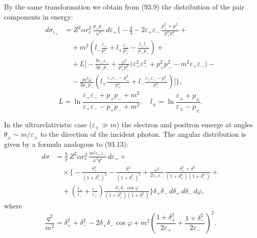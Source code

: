 By the same transformation we obtain from (93.9) the distribution of the pair components in energy:
\begin{equation}
\begin{split}
d\sigma_{\varepsilon_+} &= Z^2\alpha r_\mathrm{e}^2\,\frac{p_+p_-}{\omega^3}\,d\varepsilon_+\biggl\{-\frac{4}{3} - 2\varepsilon_+\varepsilon_-\,\frac{p_+^2 + p_-^2}{p_+^2 p_-^2} + {} \\
&\quad {} + m^2\!\left(l_-\frac{\varepsilon_+}{p_-^2} + l_+\frac{\varepsilon_-}{p_+^2} - \frac{l_+l_-}{p_+p_-}\right) + {} \\
&\quad {} + L\biggl[-\frac{8\varepsilon_+\varepsilon_-}{3p_+p_-} + \frac{\omega^3}{p_+^3 p_-^3}\bigl(\varepsilon_+^2\varepsilon_-^2 + p_+^2 p_-^2 - m^2\varepsilon_+\varepsilon_-\bigr) - {} \\
&\quad {} - \frac{m^2\omega}{2p_+p_-}\!\left(l_+\frac{\varepsilon_+\varepsilon_- - p_+^2}{p_+^3} + l_-\frac{\varepsilon_+\varepsilon_- - p_-^2}{p_-^3}\right)\biggr]\biggr\},
\end{split}
\label{eq:94.2}
\end{equation}
\[
L = \ln\frac{\varepsilon_+\varepsilon_- + p_+p_- + m^2}{\varepsilon_+\varepsilon_- - p_+p_- + m^2}, \quad l_\pm = \ln\frac{\varepsilon_\pm + p_\pm}{\varepsilon_\pm - p_\pm}.
\]


In the ultrarelativistic case ($\varepsilon_\pm \gg m$) the electron and positron emerge at angles $\theta_\pm \sim m/\varepsilon_\pm$ to the direction of the incident photon. The angular distribution is given by a formula analogous to (93.13):
\begin{equation}
\begin{split}
d\sigma &= \frac{8}{\pi}\,Z^2\alpha r_\mathrm{e}^2\,\frac{m^2\varepsilon_+\varepsilon_-}{\omega^3 q^4}\,d\varepsilon_+ \times {} \\
&\quad \times \biggl\{-\frac{\delta_+^2}{(1+\delta_+^2)^2} - \frac{\delta_-^2}{(1+\delta_-^2)^2} + \frac{\omega^2}{2\varepsilon_+\varepsilon_-}\,\frac{\delta_+^2 + \delta_-^2}{(1+\delta_+^2)(1+\delta_-^2)} + {} \\
&\quad {} + \left(\frac{\varepsilon_+}{\varepsilon_-} + \frac{\varepsilon_-}{\varepsilon_+}\right)\frac{\delta_+\delta_-\cos\varphi}{(1+\delta_+^2)(1+\delta_-^2)}\biggr\}\delta_+\delta_-\,d\delta_+\,d\delta_-\,d\varphi,
\end{split}
\label{eq:94.3}
\end{equation}
where
\begin{equation}
\frac{q^2}{m^2} = \delta_+^2 + \delta_-^2 - 2\delta_+\delta_-\cos\varphi + m^2\!\left(\frac{1+\delta_+^2}{2\varepsilon_+} + \frac{1+\delta_-^2}{2\varepsilon_-}\right)^{\!2}.
\label{eq:94.4}
\end{equation}

